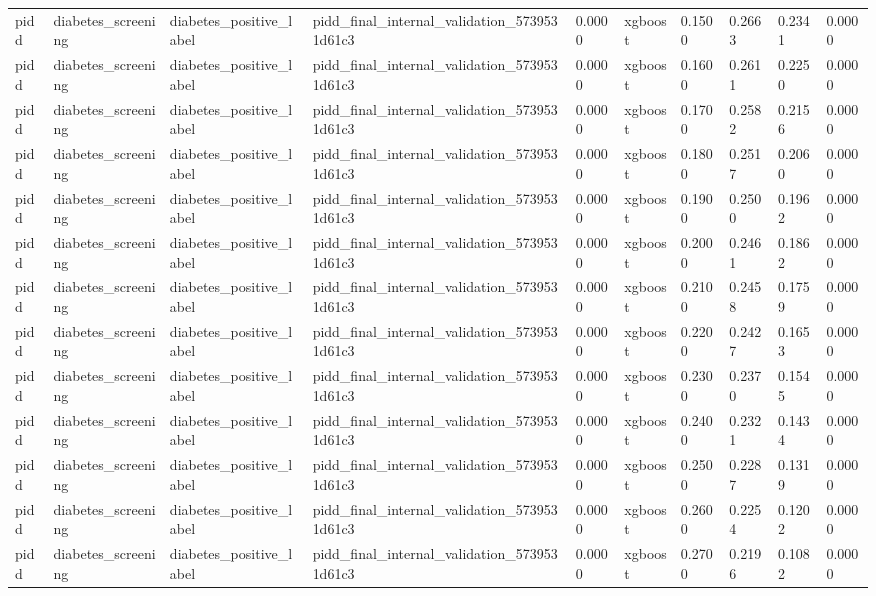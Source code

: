 \begin{tabular}{llllllllll}
pidd & diabetes\_screening & diabetes\_positive\_label & pidd\_final\_internal\_validation\_5739531d61c3 & 0.0000 & xgboost & 0.1500 & 0.2663 & 0.2341 & 0.0000 \\
pidd & diabetes\_screening & diabetes\_positive\_label & pidd\_final\_internal\_validation\_5739531d61c3 & 0.0000 & xgboost & 0.1600 & 0.2611 & 0.2250 & 0.0000 \\
pidd & diabetes\_screening & diabetes\_positive\_label & pidd\_final\_internal\_validation\_5739531d61c3 & 0.0000 & xgboost & 0.1700 & 0.2582 & 0.2156 & 0.0000 \\
pidd & diabetes\_screening & diabetes\_positive\_label & pidd\_final\_internal\_validation\_5739531d61c3 & 0.0000 & xgboost & 0.1800 & 0.2517 & 0.2060 & 0.0000 \\
pidd & diabetes\_screening & diabetes\_positive\_label & pidd\_final\_internal\_validation\_5739531d61c3 & 0.0000 & xgboost & 0.1900 & 0.2500 & 0.1962 & 0.0000 \\
pidd & diabetes\_screening & diabetes\_positive\_label & pidd\_final\_internal\_validation\_5739531d61c3 & 0.0000 & xgboost & 0.2000 & 0.2461 & 0.1862 & 0.0000 \\
pidd & diabetes\_screening & diabetes\_positive\_label & pidd\_final\_internal\_validation\_5739531d61c3 & 0.0000 & xgboost & 0.2100 & 0.2458 & 0.1759 & 0.0000 \\
pidd & diabetes\_screening & diabetes\_positive\_label & pidd\_final\_internal\_validation\_5739531d61c3 & 0.0000 & xgboost & 0.2200 & 0.2427 & 0.1653 & 0.0000 \\
pidd & diabetes\_screening & diabetes\_positive\_label & pidd\_final\_internal\_validation\_5739531d61c3 & 0.0000 & xgboost & 0.2300 & 0.2370 & 0.1545 & 0.0000 \\
pidd & diabetes\_screening & diabetes\_positive\_label & pidd\_final\_internal\_validation\_5739531d61c3 & 0.0000 & xgboost & 0.2400 & 0.2321 & 0.1434 & 0.0000 \\
pidd & diabetes\_screening & diabetes\_positive\_label & pidd\_final\_internal\_validation\_5739531d61c3 & 0.0000 & xgboost & 0.2500 & 0.2287 & 0.1319 & 0.0000 \\
pidd & diabetes\_screening & diabetes\_positive\_label & pidd\_final\_internal\_validation\_5739531d61c3 & 0.0000 & xgboost & 0.2600 & 0.2254 & 0.1202 & 0.0000 \\
pidd & diabetes\_screening & diabetes\_positive\_label & pidd\_final\_internal\_validation\_5739531d61c3 & 0.0000 & xgboost & 0.2700 & 0.2196 & 0.1082 & 0.0000 \\

\end{tabular}
